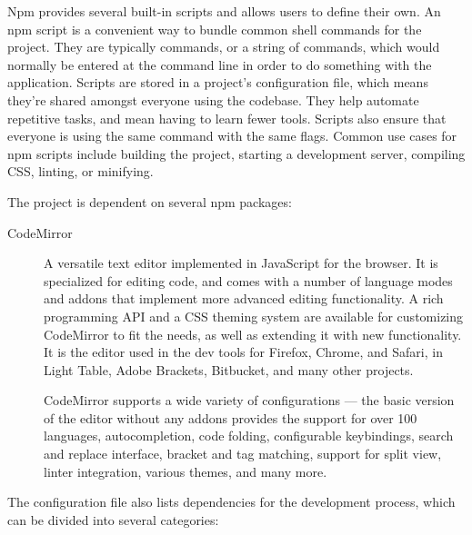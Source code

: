 \documentclass[english,engineering]{wizthesis}
\newcommand{\paraphrase}[1]{#1}
\begin{document}
Npm provides several built-in scripts and allows users to define their own.
\paraphrase{An npm script is a convenient way to bundle common shell commands
for the project. They are typically commands, or a string of commands, which
would normally be entered at the command line in order to do something with the
application. Scripts are stored in a project's configuration file, which means
they're shared amongst everyone using the codebase. They help automate
repetitive tasks, and mean having to learn fewer tools. Scripts also ensure that
everyone is using the same command with the same flags. Common use cases for npm
scripts include building the project, starting a development server, compiling
CSS, linting, or minifying.}

The project is dependent on several npm packages:
\begin{description}
  \item[CodeMirror] \cite{codemirror} \paraphrase{A versatile text editor
  implemented in JavaScript for the browser. It is specialized for editing code,
  and comes with a number of language modes and addons that implement more
  advanced editing functionality. A rich programming API and a CSS theming
  system are available for customizing CodeMirror to fit the needs, as well as
  extending it with new functionality. It is the editor used in the dev tools
  for Firefox, Chrome, and Safari, in Light Table, Adobe Brackets, Bitbucket,
  and many other projects.}

  CodeMirror supports a wide variety of configurations --- the basic version of
  the editor without any addons provides the support for over 100 languages,
  autocompletion, code folding, configurable keybindings, search and replace
  interface, bracket and tag matching, support for split view, linter
  integration, various themes, and many more.
\end{description}
The configuration file also lists dependencies for the development process,
which can be divided into several categories:
\end{document}
